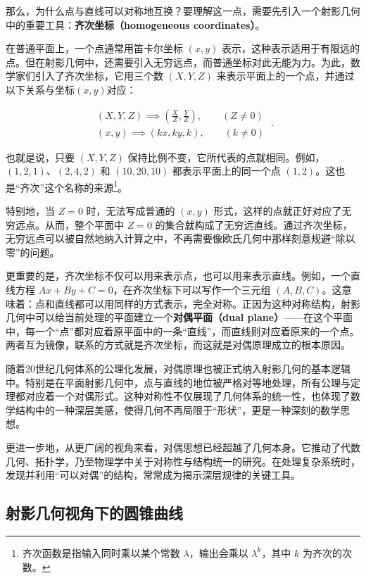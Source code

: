 那么，为什么点与直线可以对称地互换？要理解这一点，需要先引入一个射影几何中的重要工具：\textbf{齐次坐标（homogeneous coordinates）}。

在普通平面上，一个点通常用笛卡尔坐标 $(x, y)$ 表示，这种表示适用于有限远的点。但在射影几何中，还需要引入无穷远点，而普通坐标对此无能为力。为此，数学家们引入了齐次坐标，它用三个数 $(X, Y, Z)$ 来表示平面上的一个点，并通过以下关系与坐标$(x,y)$对应：

\begin{equation}
\begin{split}
(X,Y,Z) \implies \left( \frac{X}{Z}, \frac{Y}{Z} \right),\qquad(Z\neq0)\\
(x,y)\implies\left( kx, ky,k \right),\qquad(k\neq0)
\end{split}~.
\end{equation}

也就是说，只要 $(X, Y, Z)$ 保持比例不变，它所代表的点就相同。例如，$(1, 2, 1)$、$(2, 4, 2)$ 和 $(10, 20, 10)$ 都表示平面上的同一个点 $(1, 2)$。这也是“齐次”这个名称的来源\footnote{齐次函数是指输入同时乘以某个常数 $\lambda$，输出会乘以 $\lambda^k$，其中 $k$ 为齐次的次数。}。

特别地，当 $Z = 0$ 时，无法写成普通的 $(x, y)$ 形式，这样的点就正好对应了无穷远点。从而，整个平面中 $Z=0$ 的集合就构成了无穷远直线。通过齐次坐标，无穷远点可以被自然地纳入计算之中，不再需要像欧氏几何中那样刻意规避“除以零”的问题。

更重要的是，齐次坐标不仅可以用来表示点，也可以用来表示直线。例如，一个直线方程 $Ax + By + C = 0$，在齐次坐标下可以写作一个三元组 $(A, B, C)$。这意味着：点和直线都可以用同样的方式表示，完全对称。正因为这种对称结构，射影几何中可以给当前处理的平面建立一个\textbf{对偶平面（dual plane）}——在这个平面中，每一个“点”都对应着原平面中的一条“直线”，而直线则对应着原来的一个点。两者互为镜像，联系的方式就是齐次坐标，而这就是对偶原理成立的根本原因。

随着20世纪几何体系的公理化发展，对偶原理也被正式纳入射影几何的基本逻辑中。特别是在平面射影几何中，点与直线的地位被严格对等地处理，所有公理与定理都对应着一个对偶形式。这种对称性不仅展现了几何体系的统一性，也体现了数学结构中的一种深层美感，使得几何不再局限于“形状”，更是一种深刻的数学思想。

更进一步地，从更广阔的视角来看，对偶思想已经超越了几何本身。它推动了代数几何、拓扑学，乃至物理学中关于对称性与结构统一的研究。在处理复杂系统时，发现并利用“可以对偶”的结构，常常成为揭示深层规律的关键工具。

\subsection{射影几何视角下的圆锥曲线}

